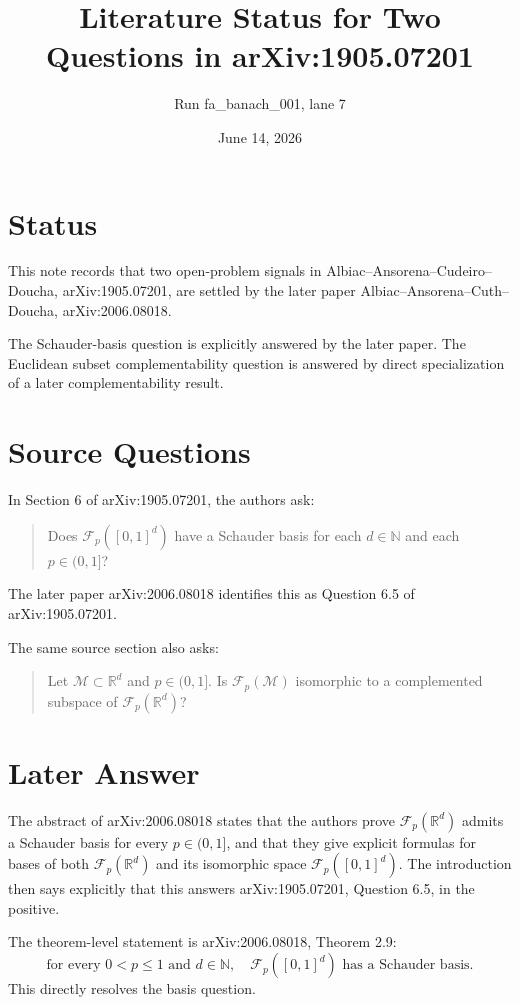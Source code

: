 \documentclass[11pt]{article}
\title{Literature Status for Two Questions in arXiv:1905.07201}
\author{Run fa\_banach\_001, lane 7}
\date{June 14, 2026}
\newcommand{\Fp}{\mathcal F_p}
\newcommand{\R}{\mathbb R}
\newcommand{\N}{\mathbb N}
\begin{document}
\maketitle

\section*{Status}

This note records that two open-problem signals in
Albiac--Ansorena--Cudeiro--Doucha, arXiv:1905.07201, are settled by the later
paper Albiac--Ansorena--Cuth--Doucha, arXiv:2006.08018.

The Schauder-basis question is explicitly answered by the later paper. The
Euclidean subset complementability question is answered by direct specialization
of a later complementability result.

\section*{Source Questions}

In Section 6 of arXiv:1905.07201, the authors ask:
\begin{quote}
Does $\Fp([0,1]^d)$ have a Schauder basis for each $d\in\N$ and each
$p\in(0,1]$?
\end{quote}
The later paper arXiv:2006.08018 identifies this as Question 6.5 of
arXiv:1905.07201.

The same source section also asks:
\begin{quote}
Let $\mathcal M\subset \R^d$ and $p\in(0,1]$. Is $\Fp(\mathcal M)$
isomorphic to a complemented subspace of $\Fp(\R^d)$?
\end{quote}

\section*{Later Answer}

The abstract of arXiv:2006.08018 states that the authors prove
$\Fp(\R^d)$ admits a Schauder basis for every $p\in(0,1]$, and that they give
explicit formulas for bases of both $\Fp(\R^d)$ and its isomorphic space
$\Fp([0,1]^d)$. The introduction then says explicitly that this answers
arXiv:1905.07201, Question 6.5, in the positive.

The theorem-level statement is arXiv:2006.08018, Theorem 2.9:
\[
  \text{for every }0<p\leq 1\text{ and }d\in\N,\quad
  \Fp([0,1]^d)\text{ has a Schauder basis.}
\]
This directly resolves the basis question.
\end{document}
